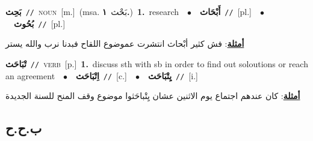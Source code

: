 \documentclass[10pt,a4paper,twoside]{article} %
\begin{document}
\begin{multicols}{2}
{\setlength\topsep{0pt}\textbf{\foreignlanguage{arabic}{بَحِث}}\ {\color{gray}\texttt{//}\color{black}}\ \textsc{noun}\ [m.]\ \color{gray}(msa. \foreignlanguage{arabic}{بَحْث}~\foreignlanguage{arabic}{\textbf{١.}})\color{black}\ \textbf{1.}~research\ \ $\bullet$\ \ \setlength\topsep{0pt}\textbf{\foreignlanguage{arabic}{أَبْحَاث}}\ {\color{gray}\texttt{//}\color{black}}\ [pl.]\ \ $\bullet$\ \ \setlength\topsep{0pt}\textbf{\foreignlanguage{arabic}{بُحُوث}}\ {\color{gray}\texttt{//}\color{black}}\ [pl.]\  \begin{flushright}\color{gray}\foreignlanguage{arabic}{\textbf{\underline{\foreignlanguage{arabic}{أمثلة}}}: فش كثير أبْحاث انتشرت عموضوع اللقاح فبدنا نرب والله يستر}\end{flushright}\color{black}} \vspace{2mm}

{\setlength\topsep{0pt}\textbf{\foreignlanguage{arabic}{تْبَاحَث}}\ {\color{gray}\texttt{//}\color{black}}\ \textsc{verb}\ [p.]\ \textbf{1.}~discuss sth with sb in order to find out soloutions or reach an agreement\ \ $\bullet$\ \ \setlength\topsep{0pt}\textbf{\foreignlanguage{arabic}{اِتْبَاحَث}}\ {\color{gray}\texttt{//}\color{black}}\ [c.]\ \ $\bullet$\ \ \setlength\topsep{0pt}\textbf{\foreignlanguage{arabic}{يِتْبَاحَث}}\ {\color{gray}\texttt{//}\color{black}}\ [i.]\  \begin{flushright}\color{gray}\foreignlanguage{arabic}{\textbf{\underline{\foreignlanguage{arabic}{أمثلة}}}: كان عندهم اجتماع يوم الاثنين عشان يِتْباحَثوا موضوع وقف المنح للسنة الجديدة}\end{flushright}\color{black}} \vspace{2mm}

\vspace{-3mm}
\subsection*{\color{blue}\foreignlanguage{arabic}{ب.ح.ح}\color{blue}{}} 


\end{multicols}
\end{document}

